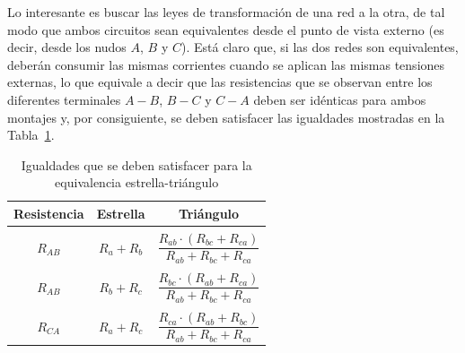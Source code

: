 	Lo interesante es buscar las leyes de transformación de una
        red a la otra, de tal modo que ambos circuitos sean
        equivalentes desde el punto de vista externo (es decir, desde
        los nudos $A$, $B$ y $C$). Está claro que, si las dos redes
        son equivalentes, deberán consumir las mismas corrientes
        cuando se aplican las mismas tensiones externas, lo que
        equivale a decir que las resistencias que se observan entre
        los diferentes terminales $A-B$, $B-C$ y $C-A$ deben ser
        idénticas para ambos montajes y, por consiguiente, se deben
        satisfacer las igualdades mostradas en la
        Tabla~\ref{tab.igualdades_estrellatriangulo}.
	\begin{table}[H]
          \centering
          \begin{tabular}{c|c|c} \textbf{Resistencia} &
            \textbf{Estrella} & \textbf{Triángulo}\\\hline
                                                      &&        \\[-0.75em]
            $R_{AB}$ & $R_a+R_b$ & $\dfrac{R_{ab} \cdot (R_{bc} + R_{ca})}{R_{ab} + R_{bc} + R_{ca}}$\\
                                                      &&         \\[-0.75em]
            $R_{AB}$ & $R_b+R_c$ & $\dfrac{R_{bc} \cdot (R_{ab} + R_{ca})}{R_{ab} + R_{bc} + R_{ca}}$\\
                                                      && \\[-0.75em]
            $R_{CA}$ & $R_a+R_c$ & $\dfrac{R_{ca} \cdot (R_{ab} + R_{bc})}{R_{ab} + R_{bc} + R_{ca}}$\\
          \end{tabular}
          \caption{Igualdades que se deben satisfacer para la
            equivalencia estrella-triángulo}
          \label{tab.igualdades_estrellatriangulo}
	\end{table}
	
